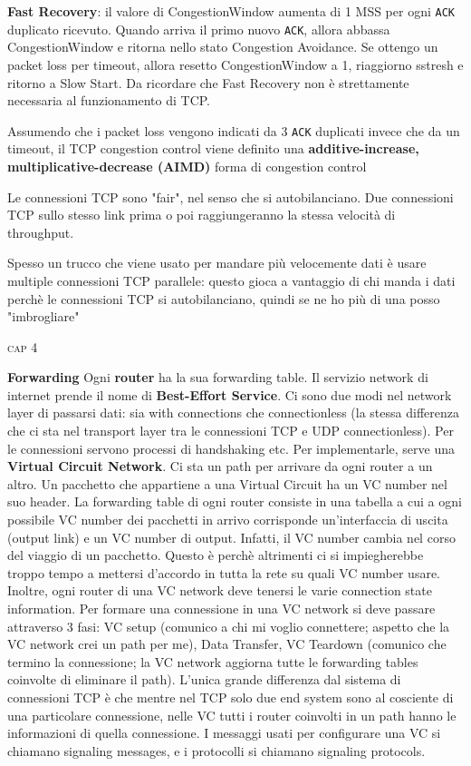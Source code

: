 \documentclass[a4paper,10pt]{article} %
\renewcommand{\b}[1]{%
    {\textbf{#1}}}
\renewcommand{\t}[1]{%
    {\texttt{#1}}}
\begin{document}
\b{Fast Recovery}: il valore di CongestionWindow aumenta di 1 MSS per ogni \t{ACK} duplicato ricevuto. Quando arriva il primo nuovo \t{ACK}, allora abbassa CongestionWindow e ritorna nello stato Congestion Avoidance. Se ottengo un packet loss per timeout, allora resetto CongestionWindow a 1, riaggiorno sstresh e ritorno a Slow Start. Da ricordare che Fast Recovery non è strettamente necessaria al funzionamento di TCP.

Assumendo che i packet loss vengono indicati da 3 \t{ACK} duplicati invece che da un timeout, il TCP congestion control viene definito una \b{additive-increase, multiplicative-decrease (AIMD)} forma di congestion control

Le connessioni TCP sono "fair", nel senso che si autobilanciano. Due connessioni TCP sullo stesso link prima o poi raggiungeranno la stessa velocità di throughput.

Spesso un trucco che viene usato per mandare più velocemente dati è usare multiple connessioni TCP parallele: questo gioca a vantaggio di chi manda i dati perchè le connessioni TCP si autobilanciano, quindi se ne ho più di una posso "imbrogliare"

\newpage

\vspace{3pt}
\centerline{\textsc{ \normalsize {cap 4}}}
\vspace{3pt}

\b{Forwarding} Ogni \b{router} ha la sua forwarding table. Il servizio network di internet prende il nome di \b{Best-Effort Service}. Ci sono due modi nel network layer di passarsi dati: sia with connections che connectionless (la stessa differenza che ci sta nel transport layer tra le connessioni TCP e UDP connectionless). Per le connessioni servono processi di handshaking etc. Per implementarle, serve una \b{Virtual Circuit Network}. Ci sta un path per arrivare da ogni router a un altro. Un pacchetto che appartiene a una Virtual Circuit ha un VC number nel suo header. La forwarding table di ogni router consiste in una tabella a cui a ogni possibile VC number dei pacchetti in arrivo corrisponde un'interfaccia di uscita (output link) e un VC number di output. Infatti, il VC number cambia nel corso del viaggio di un pacchetto. Questo è perchè altrimenti ci si impiegherebbe troppo tempo a mettersi d'accordo in tutta la rete su quali VC number usare. Inoltre, ogni router di una VC network deve tenersi le varie connection state information. Per formare una connessione in una VC network si deve passare attraverso 3 fasi: VC setup (comunico a chi mi voglio connettere; aspetto che la VC network crei un path per me), Data Transfer, VC Teardown (comunico che termino la connessione; la VC network aggiorna tutte le forwarding tables coinvolte di eliminare il path). L'unica grande differenza dal sistema di connessioni TCP è che mentre nel TCP solo due end system sono al cosciente di una particolare connessione, nelle VC tutti i router coinvolti in un path hanno le informazioni di quella connessione. I messaggi usati per configurare una VC si chiamano signaling messages, e i protocolli si chiamano signaling protocols.
\end{document}
